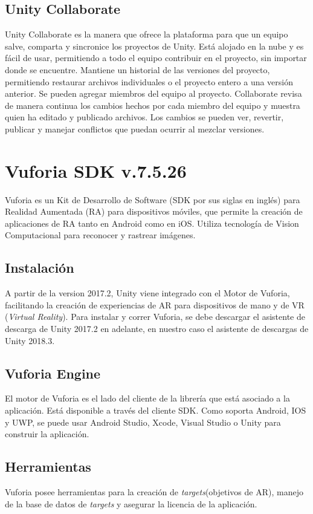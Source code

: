 \subsection{Unity Collaborate}
Unity Collaborate es la manera que ofrece la plataforma para que un equipo salve, comparta y sincronice los proyectos de Unity. Está alojado en la nube y es fácil de usar, permitiendo a todo el equipo contribuir en el proyecto, sin importar donde se encuentre. Mantiene un historial de las versiones del proyecto, permitiendo restaurar archivos individuales o el proyecto entero a una versión anterior. Se pueden agregar miembros del equipo al proyecto. Collaborate revisa de manera continua los cambios hechos por cada miembro del equipo y muestra quien ha editado y publicado archivos. Los cambios se pueden ver, revertir, publicar y manejar conflictos que puedan ocurrir al mezclar versiones.

\section{Vuforia SDK v.7.5.26}
Vuforia es un Kit de Desarrollo de Software (SDK por sus siglas en inglés) para Realidad Aumentada (RA) para dispositivos móviles, que permite la creación de aplicaciones de RA tanto en Android como en iOS. Utiliza tecnología de Vision Computacional para reconocer y rastrear imágenes.

\subsection{Instalación}
A partir de la version 2017.2, Unity viene integrado con el Motor de Vuforia, facilitando la creación de experiencias de AR para dispositivos de mano y de VR (\textit{Virtual Reality}). Para instalar y correr Vuforia, se debe descargar el asistente de descarga de Unity 2017.2 en adelante, en nuestro caso el asistente de descargas de Unity 2018.3.

\subsection{Vuforia Engine}
El motor de Vuforia es el lado del cliente de la librería que está asociado a la aplicación. Está disponible a través del cliente SDK. Como soporta Android, IOS y UWP, se puede usar Android Studio, Xcode, Visual Studio o Unity para construir la aplicación.

\subsection{Herramientas}
Vuforia posee herramientas para la creación de \textit{targets}(objetivos de AR), manejo de la base de datos de \textit{targets} y asegurar la licencia de la aplicación.

